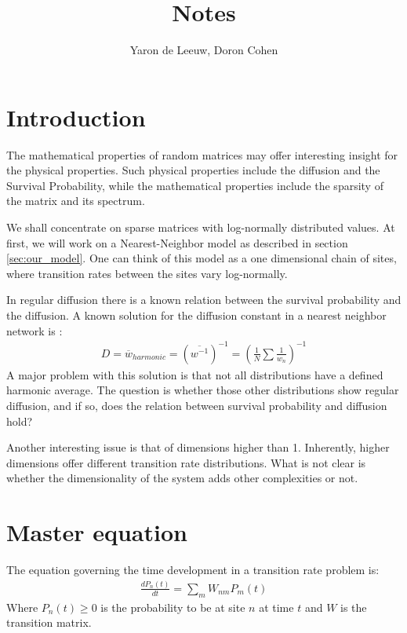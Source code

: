 \documentclass[onecolumn,fleqn]{revtex4}
\begin{document}
\title{Notes}

\author{Yaron de Leeuw, Doron Cohen}

\maketitle



\section{Introduction}
The mathematical properties of random matrices may offer interesting insight for the physical properties. Such physical properties include the diffusion and the Survival Probability, while the mathematical properties include the sparsity of the matrix and its spectrum. 

We shall concentrate on sparse matrices with log-normally distributed values. At first, we will work on a Nearest-Neighbor model as described in section \ref{sec:our_model}. One can think of this model as a one dimensional chain of sites, where transition rates between the sites vary log-normally.

In regular diffusion there is a known relation between the survival probability and the diffusion. 
A known solution for the diffusion constant in a nearest neighbor network is \cite{Derrida:1983}:
\begin{align}
D=\overline{w}_{harmonic} =(\overline{w^{-1}})^{-1}=\left(\frac{1}{N}\sum\frac{1}{w_n}\right)^{-1}
\end{align}
A major problem with this solution is that not all distributions have a defined harmonic average. The question is whether those other distributions show regular diffusion, and if so, does the relation between survival probability and diffusion hold?


Another interesting issue is that of dimensions higher than 1. Inherently, higher dimensions offer different transition rate distributions. What is not clear is whether the dimensionality of the system adds other complexities or not. 



\section{Master equation}
The equation governing the time development in a transition rate problem is:
\begin{align}
\frac{dP_n(t)}{dt} = \sum_m W_{nm}P_m(t)
\end{align}
Where $P_n(t) \ge 0$ is the probability to be at site $n$ at time $t$ and $W$ is the transition matrix.
\end{document}
